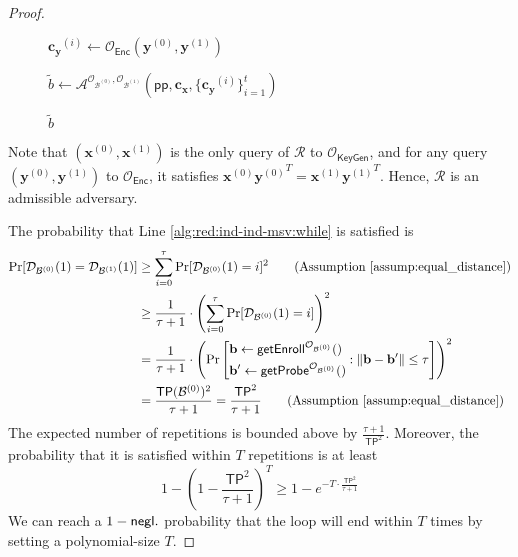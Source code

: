 \begin{proof}
\begin{figure}[h]
\begin{minipage}[t]{0.75\linewidth}
\begin{algorithm}[H]
\begin{algorithmic}[1]


			\State $\mathbf{c_y}^{(i)} \gets \mathcal{O}_{\textsf{Enc}}(\mathbf{y}^{(0)}, \mathbf{y}^{(1)})$ \label{alg:red:ind-ind-msv:cy}

		\EndFor

		\State $\tilde{b} \gets {\mathcal{A}}^{\mathcal{O}_{\mathcal{B}^{(0)}}, \mathcal{O}_{\mathcal{B}^{(1)}} } (\textsf{pp}, \mathbf{c_x}, \{ \mathbf{c_y}^{(i)} \}_{i=1}^t )$ \label{alg:red:ind-ind-msv:A}

		\State \Return $\tilde{b}$

	\end{algorithmic}
	\end{algorithm}
	\end{minipage}
	
\end{figure}

\noindent Note that $(\mathbf{x}^{(0)}, \mathbf{x}^{(1)})$ is the only query of $\mathcal{R}$ to $\mathcal{O}_{\textsf{KeyGen}}$, and for any query $( \mathbf{y}^{(0)}, {\mathbf{y}^{(1)}} )$ to $\mathcal{O}_{\textsf{Enc}}$, it satisfies $\mathbf{x}^{(0)}{\mathbf{y}^{(0)}}^T = \mathbf{x}^{(1)}{\mathbf{y}^{(1)}}^T$. Hence, $\mathcal{R}$ is an admissible adversary.

The probability that Line \ref{alg:red:ind-ind-msv:while} is satisfied is
\begin{align*}
	\Pr[\mathcal{D}_{\mathcal{B}^{(0)}}(1) = \mathcal{D}_{\mathcal{B}^{(1)}}(1)] 
	&\geq \sum_{i=0}^\tau \Pr[\mathcal{D}_{\mathcal{B}^{(0)}}(1) = i]^2 \qquad \text{(Assumption \ref{assump:equal_distance})} \\
	&\geq \frac{1}{\tau + 1} \cdot \left( \sum_{i=0}^\tau \Pr[\mathcal{D}_{\mathcal{B}^{(0)}}(1) = i] \right)^2 \\
	&= \frac{1}{\tau + 1} \cdot \left( \Pr \left[
		\begin{aligned}
			& \mathbf{b} \gets \textsf{getEnroll}^{\mathcal{O}_{\mathcal{B}^{(0)}} }() \\
			& \mathbf{b}^\prime \gets \textsf{getProbe}^{\mathcal{O}_{\mathcal{B}^{(0)}} }()
		\end{aligned}
		: \| \mathbf{b} - \mathbf{b}^\prime \| \leq \tau \right] \right)^2 \\
	&= \frac{ \textsf{TP}(\mathcal{B}^{(0)})^2 }{\tau + 1} = \frac{ \textsf{TP}^2 }{\tau + 1} \qquad \text{(Assumption \ref{assump:equal_distance})} 
\end{align*}
The expected number of repetitions is bounded above by $\frac{\tau + 1}{ \textsf{TP}^2 }$. Moreover, the probability that it is satisfied within $T$ repetitions is at least
\[
	1 - (1 - \frac{ \textsf{TP}^2 }{\tau + 1})^T \geq 1 - e^{-T \cdot \frac{ \textsf{TP}^2 }{\tau + 1}}
\]
We can reach a $1 - \mathsf{negl}.$ probability that the loop will end within $T$ times by setting a polynomial-size $T$.


\end{proof}
